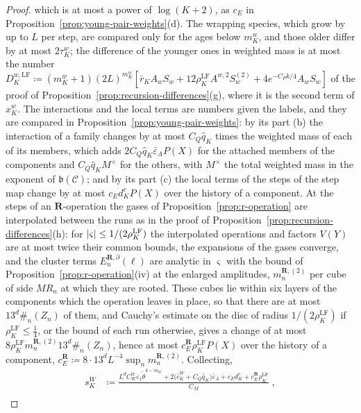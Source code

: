 \documentclass[11pt]{preprint}
\DeclarePairedDelimiter{\abs}{\lvert}{\rvert}
\numberwithin{equation}{section}
\theoremstyle{definition}
\theoremstyle{remark}
\theoremstyle{plain}
\begin{document}
\begin{proof}
which is at most a power of $\log(K + 2)$, as $c_E$ in Proposition~\ref{prop:young-pair-weights}(d). The wrapping species, which grow by up to $L$ per step, are compared only for the ages below $m^w_K$, and those older differ by at most $2\tau^w_K$; the difference of the younger ones in weighted mass is at most the number $D^{w,\mathrm{LF}}_K \coloneqq (m^w_K + 1)(2L)^{m^w_K}[\bar r_KA_wS_w + 12\rho^{\mathrm{LF}}_KA^{w,2}S^{(2)}_w + 4e^{-C_Pk/4}A_wS_w]$ of the proof of Proposition~\ref{prop:recursion-differences}(g), where it is the second term of $x^w_K$. The interactions and the local terms are numbers given the labels, and they are compared in Proposition~\ref{prop:young-pair-weights}: by its part (b) the interaction of a family changes by at most $C_Q\hat q_K$ times the weighted mass of each of its members, which adds $2C_Q\hat q_K\bar\varepsilon_AP(X)$ for the attached members of the components and $C_Q\hat q_KM^\times$ for the others, with $M^\times$ the total weighted mass in the exponent of $\mathfrak b(\mathcal C)$; and by its part (c) the local terms of the steps of the step map change by at most $c_Ed^c_KP(X)$ over the history of a component. At the steps of an $\mathbf R$-operation the gases of Proposition~\ref{prop:r-operation} are interpolated between the runs as in the proof of Proposition~\ref{prop:recursion-differences}(h): for $\abs\varsigma \leq 1/(2\rho^{\mathrm{LF}}_K)$ the interpolated operations and factors $V(Y)$ are at most twice their common bounds, the expansions of the gases converge, and the cluster terms $E^{\mathbf R,\partial}_n(\ell)$ are analytic in $\varsigma$ with the bound of Proposition~\ref{prop:r-operation}(iv) at the enlarged amplitudes, $m^{\mathbf R,(2)}_n$ per cube of side $MR_n$ at which they are rooted. These cubes lie within six layers of the components which the operation leaves in place, so that there are at most $13^d\#_n(Z_n)$ of them, and Cauchy's estimate on the disc of radius $1/(2\rho^{\mathrm{LF}}_K)$ if $\rho^{\mathrm{LF}}_K \leq \frac14$, or the bound of each run otherwise, gives a change of at most $8\rho^{\mathrm{LF}}_Km^{\mathbf R,(2)}_n13^d\#_n(Z_n)$, hence at most $c^{\mathbf R}_E\rho^{\mathrm{LF}}_KP(X)$ over the history of a component, $c^{\mathbf R}_E \coloneqq 8 \cdot 13^dL^{-4}\sup_nm^{\mathbf R,(2)}_n$. Collecting,
\begin{equation}\label{eq:dressing-rates}
\begin{aligned}
    s^W_K &\coloneqq \frac{L^dC^{\mathrm{tr}}_W\varepsilon_1\tilde\theta^{k-m_W} + 2\bigl(\bar c^W_K + C_Q\hat q_K\bigr)\bar\varepsilon_A + c_Ed^c_K + c^{\mathbf R}_E\rho^{\mathrm{LF}}_K}{C_M}\;,\\

\end{aligned}
\end{equation}
\end{proof}
\end{document}
